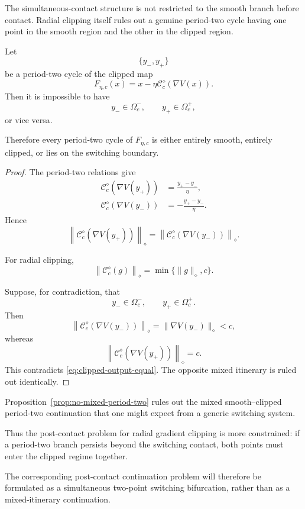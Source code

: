 The simultaneous-contact structure is not restricted to the smooth
branch before contact.  Radial clipping itself rules out a genuine
period-two cycle having one point in the smooth region and the other
in the clipped region.

\begin{proposition}
\label{prop:no-mixed-period-two}
Let
\[
\{y_-,y_+\}
\]
be a period-two cycle of the clipped map
\[
F_{\eta,c}(x)
=
x-\eta
\mathcal C_c^\diamond(\nabla V(x)).
\]
Then it is impossible to have
\begin{equation}
y_-\in\Omega_c^-,
\qquad
y_+\in\Omega_c^+,
\label{eq:forbidden-mixed-cycle}
\end{equation}
or vice versa.

Therefore every period-two cycle of $F_{\eta,c}$ is either entirely
smooth, entirely clipped, or lies on the switching boundary.
\end{proposition}

\begin{proof}
The period-two relations give
\begin{align}
\mathcal C_c^\diamond(\nabla V(y_+))
&=
\frac{y_+-y_-}{\eta},
\label{eq:clipped-balance-plus}
\\
\mathcal C_c^\diamond(\nabla V(y_-))
&=
-\frac{y_+-y_-}{\eta}.
\label{eq:clipped-balance-minus}
\end{align}
Hence
\begin{equation}
\left\|
\mathcal C_c^\diamond(\nabla V(y_+))
\right\|_\diamond
=
\left\|
\mathcal C_c^\diamond(\nabla V(y_-))
\right\|_\diamond.
\label{eq:clipped-output-equal}
\end{equation}

For radial clipping,
\begin{equation}
\left\|
\mathcal C_c^\diamond(g)
\right\|_\diamond
=
\min\{\|g\|_\diamond,c\}.
\label{eq:clipped-output-norm}
\end{equation}

Suppose, for contradiction, that
\[
y_-\in\Omega_c^-,
\qquad
y_+\in\Omega_c^+.
\]
Then
\[
\left\|
\mathcal C_c^\diamond(\nabla V(y_-))
\right\|_\diamond
=
\|\nabla V(y_-)\|_\diamond
<
c,
\]
whereas
\[
\left\|
\mathcal C_c^\diamond(\nabla V(y_+))
\right\|_\diamond
=
c.
\]
This contradicts \eqref{eq:clipped-output-equal}.
The opposite mixed itinerary is ruled out identically.
\end{proof}

\begin{remark}
\label{rem:no-mixed-consequence}
Proposition~\ref{prop:no-mixed-period-two} rules out the
mixed smooth--clipped period-two continuation that one might expect
from a generic switching system.

Thus the post-contact problem for radial gradient clipping is more
constrained: if a period-two branch persists beyond the switching
contact, both points must enter the clipped regime together.

The corresponding post-contact continuation problem will therefore
be formulated as a simultaneous two-point switching bifurcation,
rather than as a mixed-itinerary continuation.
\end{remark}

